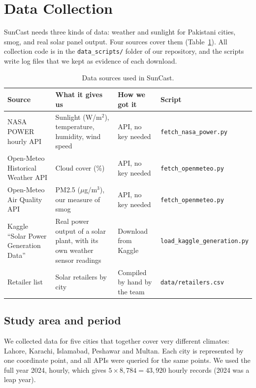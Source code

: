 \section{Data Collection}
\label{sec:collection}

SunCast needs three kinds of data: weather and sunlight for Pakistani cities, smog, and real solar panel output. Four sources cover them (Table~\ref{tab:sources}). All collection code is in the \texttt{data\_scripts/} folder of our repository, and the scripts write log files that we kept as evidence of each download.

\begin{table}[H]
\centering
\small
\begin{tabular}{p{3.1cm} p{4.0cm} p{2.9cm} p{3.4cm}}
\toprule
\textbf{Source} & \textbf{What it gives us} & \textbf{How we got it} & \textbf{Script} \\
\midrule
NASA POWER hourly API & Sunlight (W/m$^2$), temperature, humidity, wind speed & API, no key needed & \texttt{fetch\_nasa\_\allowbreak power.py} \\
Open-Meteo Historical Weather API & Cloud cover (\%) & API, no key needed & \texttt{fetch\_\allowbreak openmeteo.py} \\
Open-Meteo Air Quality API & PM2.5 ($\mu$g/m$^3$), our measure of smog & API, no key needed & \texttt{fetch\_\allowbreak openmeteo.py} \\
Kaggle ``Solar Power Generation Data'' & Real power output of a solar plant, with its own weather sensor readings & Download from Kaggle & \texttt{load\_kaggle\_\allowbreak generation.py} \\
Retailer list & Solar retailers by city & Compiled by hand by the team & \texttt{data/retailers.csv} \\
\bottomrule
\end{tabular}
\caption{Data sources used in SunCast.}
\label{tab:sources}
\end{table}

\subsection{Study area and period}
We collected data for five cities that together cover very different climates: Lahore, Karachi, Islamabad, Peshawar and Multan. Each city is represented by one coordinate point, and all APIs were queried for the same points. We used the full year 2024, hourly, which gives $5 \times 8{,}784 = 43{,}920$ hourly records (2024 was a leap year).

